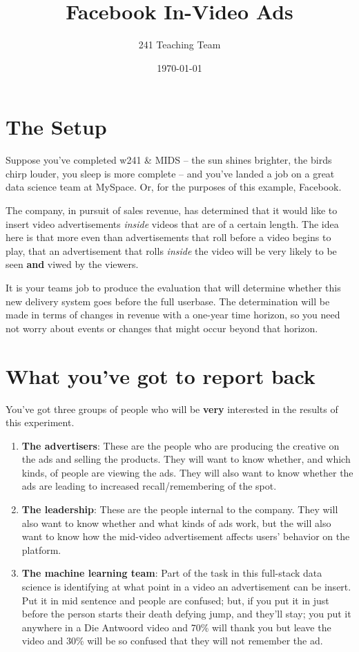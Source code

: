 \documentclass{article}
\author{241 Teaching Team}
\date{\today}
\title{Facebook In-Video Ads}
\begin{document}
\maketitle

\section{The Setup}
\label{sec:org75918e5}
Suppose you've completed w241 \& MIDS -- the sun shines brighter, the birds chirp louder, you sleep is more complete -- and you've landed a job on a great data science team at MySpace. Or, for the purposes of this example, Facebook. 

The company, in pursuit of sales revenue, has determined that it would like to insert video advertisements \emph{inside} videos that are of a certain length. The idea here is that more even than advertisements that roll before a video begins to play, that an advertisement that rolls \emph{inside} the video will be very likely to be seen \textbf{and} viwed by the viewers. 

It is your teams job to produce the evaluation that will determine whether this new delivery system goes before the full userbase. The determination will be made in terms of changes in revenue with a one-year time horizon, so you need not worry about events or changes that might occur beyond that horizon. 

\section{What you've got to report back}
\label{sec:org0fb43e7}
You've got three groups of people who will be \textbf{very} interested in the results of this experiment. 

\begin{enumerate}
\item \textbf{The advertisers}: These are the people who are producing the creative on the ads and selling the products. They will want to know whether, and which kinds, of people are viewing the ads. They will also want to know whether the ads are leading to increased recall/remembering of the spot.
\item \textbf{The leadership}: These are the people internal to the company. They will also want to know whether and what kinds of ads work, but the will also want to know how the mid-video advertisement affects users' behavior on the platform.
\item \textbf{The machine learning team}: Part of the task in this full-stack
data science is identifying at what point in a video an
advertisement can be insert. Put it in mid sentence and people are
confused; but, if you put it in just before the person starts their
death defying jump, and they'll stay; you put it anywhere in a Die
Antwoord  video and 70\% will thank you but leave the video and 30\%
will be so confused that they will not remember the ad.
\end{enumerate}
\end{document}
